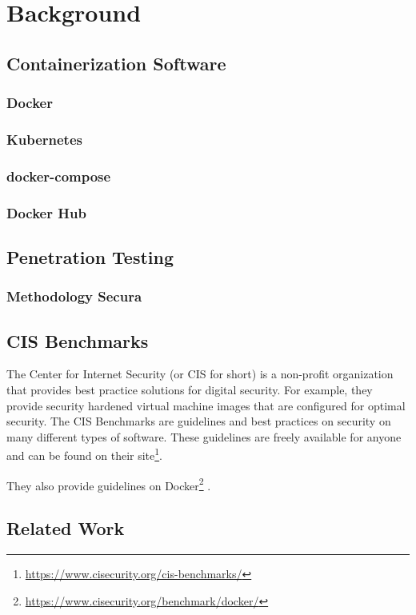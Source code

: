 \chapter{Background}

\section{Containerization Software}
\subsection{Docker}
\subsection{Kubernetes}
\subsection{docker-compose}
\subsection{Docker Hub}
\section{Penetration Testing}
\subsection{Methodology Secura}
\section{CIS Benchmarks}
The Center for Internet Security (or CIS for short) is a non-profit organization that provides best practice solutions for digital security. For example, they provide security hardened virtual machine images that are configured for optimal security.
The CIS Benchmarks are guidelines and best practices on security on many different types of software.
These guidelines are freely available for anyone and can be found on their site\footnote{\url{https://www.cisecurity.org/cis-benchmarks/}}.

\hfill

They also provide guidelines on Docker\footnote{\url{https://www.cisecurity.org/benchmark/docker/}} .




\section{Related Work}
